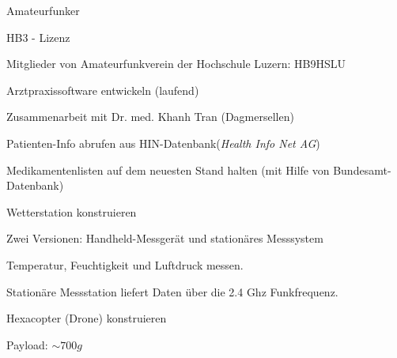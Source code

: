 

\begin{cventries}

	\cventry
	{} %
	{Amateurfunker} %
	{} %
	{} %
	{\vspace{-12pt}
		\begin{cvitems} %
			\item {HB3 - Lizenz}
			\item {Mitglieder von Amateurfunkverein der Hochschule Luzern: HB9HSLU}
		\end{cvitems}
	}
	
	\cventry
	{} %
	{Arztpraxissoftware entwickeln (laufend)} %
	{} %
	{} %
	{\vspace{-12pt}
		\begin{cvitems} %
			\item {Zusammenarbeit mit Dr. med. Khanh Tran (Dagmersellen)}
			\item {Patienten-Info abrufen aus HIN-Datenbank(\textit{Health Info Net AG})}
			\item {Medikamentenlisten auf dem neuesten Stand halten (mit Hilfe von Bundesamt-Datenbank)}
		\end{cvitems}
	}
	
	\cventry
	{} %
	{Wetterstation konstruieren} %
	{} %
	{} %
	{\vspace{-12pt}
		\begin{cvitems} %
			\item {Zwei Versionen: Handheld-Messgerät und stationäres Messsystem}
			\item {Temperatur, Feuchtigkeit und Luftdruck messen.}
			\item {Stationäre Messstation liefert Daten über die 2.4 Ghz Funkfrequenz.}
		\end{cvitems}
	}
	
	\cventry
	{} %
	{Hexacopter (Drone) konstruieren} %
	{} %
	{} %
	{\vspace{-12pt}
		\begin{cvitems} %
			\item {Payload: $ \sim 700g$}
		\end{cvitems}
	}
	

\end{cventries}
